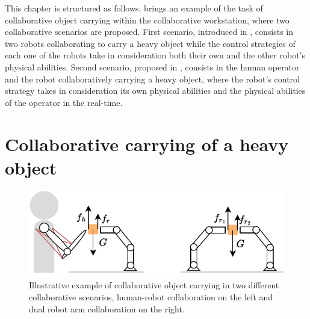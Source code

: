 
This chapter is structured as follows.  brings an example of the task of collaborative object carrying within the collaborative workstation, where two collaborative scenarios are proposed. First scenario, introduced in , consists in two robots collaborating to carry a heavy object while the control strategies of each one of the robots take in consideration both their own and the other robot's physical abilities. Second scenario, proposed in , consists in the human operator and the robot collaboratively carrying a heavy object, where the robot's control strategy takes in consideration its own physical abilities and the physical abilities of the operator in the real-time. 




\section{Collaborative carrying of a heavy object}
\label{ch:collaborative_carrying}

\begin{figure}[!h]
    \centering
    \includegraphics[width=0.8\linewidth]{Papers/images/carrying_schema.pdf}
    \caption{Illustrative example of collaborative object carrying in two different collaborative scenarios, human-robot collaboration on the left and dual robot arm collaboration on the right.}
    \label{fig:carrying_schema}
\end{figure}

